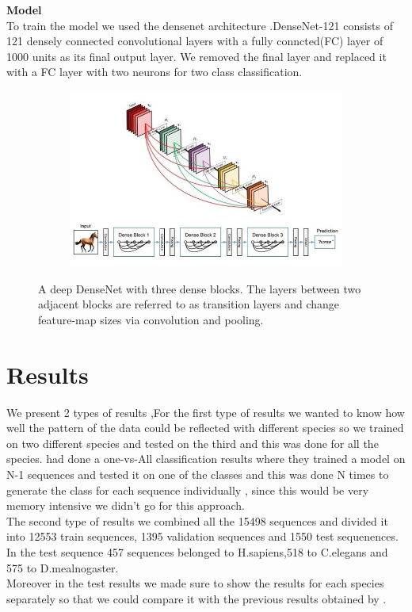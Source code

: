 \documentclass{article}
\begin{document}
\textbf{Model}\\
To train the model we used the densenet architecture \citep{huang2018densely}.DenseNet-121 consists of 121 densely connected convolutional layers with a fully conncted(FC) layer of 1000 units as its final output layer. We removed the final layer and replaced it with a FC layer with two neurons for two class classification.

\begin{figure}[H]
  \centering
  \begin{subfigure}{10.5cm}
    \centering\includegraphics[width=10.5cm]{densenet.jpeg}
  \end{subfigure}
  \caption{A deep DenseNet with three dense blocks. The layers between two adjacent blocks are referred to as transition layers and change
feature-map sizes via convolution and pooling.}
 \label{fig:previous_results}
\end{figure}
\section{Results}
We present 2 types of results ,For the first type of results we wanted to know how well the pattern of the data could be reflected with different species so we 
trained on two different species and tested on the third and this was done for all the species. \citep{Guo1093bioinformaticsbtu083-ss} had done a 
one-vs-All classification results where they trained a model on N-1 sequences and tested it on one of the classes and this was done N times to generate the class for each sequence individually , since this would be very memory intensive we didn't go for this approach. \\ 
The second type of results we combined all the 15498 sequences and divided it into 12553 train sequences, 1395 validation sequences and 1550 test sequenences. 
In the test sequence 457 sequences belonged to H.sapiens,518 to C.elegans and 575 to D.mealnogaster. \\
Moreover in the test results we made sure to show the results for each species separately so that we could compare it with the previous results obtained by  \citep{Guo1093bioinformaticsbtu083-ss}.
\end{document}
